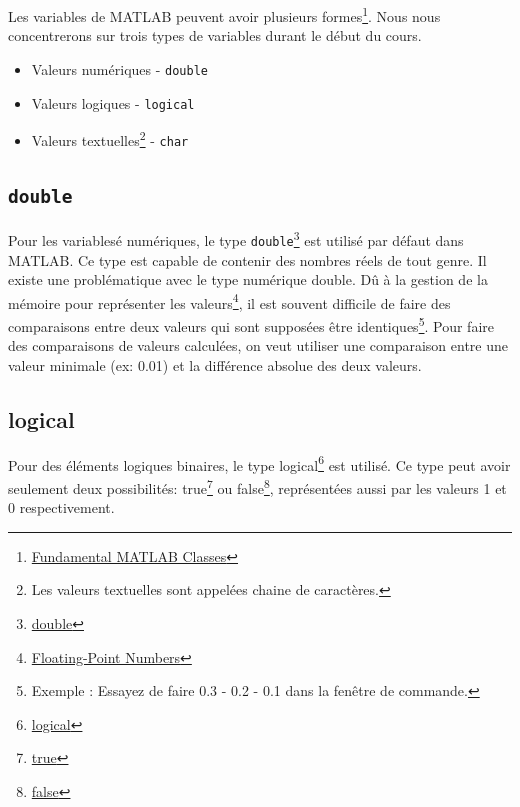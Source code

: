 \documentclass[]{tufte-handout}
\newcommand{\passthrough}[1]{#1}
\providecommand{\tightlist}{%
  \setlength{\itemsep}{0pt}\setlength{\parskip}{0pt}}
\begin{document}
Les variables de MATLAB peuvent avoir plusieurs formes\footnote{\href{https://www.mathworks.com/help/matlab/matlab_prog/fundamental-matlab-classes.html}{Fundamental
  MATLAB Classes}}. Nous nous concentrerons sur trois types de variables
durant le début du cours.

\begin{itemize}
\tightlist
\item
  Valeurs numériques - \passthrough{\lstinline!double!}
\item
  Valeurs logiques - \passthrough{\lstinline!logical!}
\item
  Valeurs textuelles\footnote{Les valeurs textuelles sont appelées
    chaine de caractères.} - \passthrough{\lstinline!char!}
\end{itemize}

\hypertarget{double}{%
\subsection{\texorpdfstring{\texttt{double}}{double}}\label{double}}

Pour les variablesé numériques, le type
\passthrough{\lstinline!double!}\footnote{\href{https://www.mathworks.com/help/matlab/ref/double.html}{double}}
est utilisé par défaut dans MATLAB. Ce type est capable de contenir des
nombres réels de tout genre. Il existe une problématique avec le type
numérique double. Dû à la gestion de la mémoire pour représenter les
valeurs\footnote{\href{https://www.mathworks.com/help/matlab/matlab_prog/floating-point-numbers.html}{Floating-Point
  Numbers}}, il est souvent difficile de faire des comparaisons entre
deux valeurs qui sont supposées être identiques\footnote{Exemple :
  Essayez de faire 0.3 - 0.2 - 0.1 dans la fenêtre de commande.}. Pour
faire des comparaisons de valeurs calculées, on veut utiliser une
comparaison entre une valeur minimale (ex: 0.01) et la différence
absolue des deux valeurs.

\hypertarget{logical}{%
\subsection{logical}\label{logical}}

Pour des éléments logiques binaires, le type logical\footnote{\href{https://www.mathworks.com/help/matlab/ref/logical.html}{logical}}
est utilisé. Ce type peut avoir seulement deux possibilités:
true\footnote{\href{https://www.mathworks.com/help/matlab/ref/true.html}{true}}
ou false\footnote{\href{https://www.mathworks.com/help/matlab/ref/false.html}{false}},
représentées aussi par les valeurs 1 et 0 respectivement.
\end{document}

